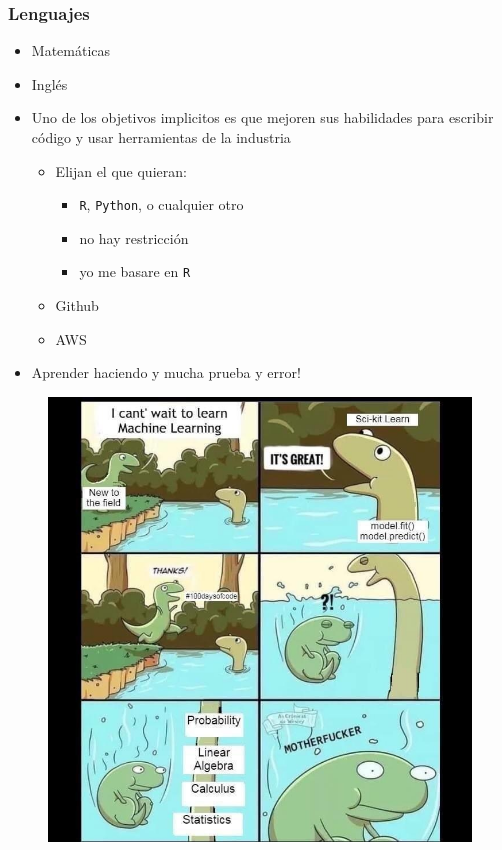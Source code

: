 \documentclass[
  shownotes,
  xcolor={svgnames},
  hyperref={colorlinks,citecolor=DarkBlue,linkcolor=DarkRed,urlcolor=DarkBlue}
  ]{beamer}
\begin{document}
\begin{frame}
\frametitle{Lenguajes}


\begin{minipage}[t]{0.58\linewidth}
        \begin{itemize}
            \item Matemáticas
            \bigskip
            \item Inglés
            \bigskip
            \item Uno de los objetivos implicitos es que mejoren sus habilidades para escribir código y usar herramientas de la industria
            \begin{itemize}
              \item Elijan el que quieran: 
              \begin{itemize}
                \item \texttt{R}, \texttt{Python}, o cualquier otro
                \item no hay restricción
                \item yo me basare en \texttt{R}
                \end{itemize}
              \item Github
              \item AWS
            \end{itemize}
            \item Aprender haciendo y mucha prueba y error! 
            
        \end{itemize}
    \end{minipage}
    \hfill
    \begin{minipage}[t]{0.38\linewidth}%
        \begin{figure}[H] \centering
            \captionsetup{justification=centering}  
            \includegraphics[scale=0.2]{figures/ml_trick}
    \end{figure}
    \end{minipage}


\end{frame}
\end{document}
